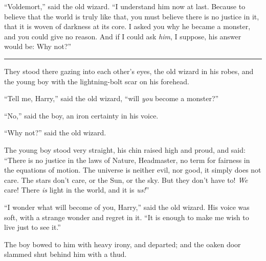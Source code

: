 ``Voldemort,'' said the old wizard. ``I understand him now at last. Because to believe that the world is truly like that, you must believe there is no justice in it, that it is woven of darkness at its core. I asked you why he became a monster, and you could give no reason. And if I could ask \emph{him}, I suppose, his answer would be: Why not?''

\begin{center}\rule{3in}{0.4pt}\end{center}

They stood there gazing into each other's eyes, the old wizard in his robes, and the young boy with the lightning-bolt scar on his forehead.

``Tell me, Harry,'' said the old wizard, ``will \emph{you} become a monster?''

``No,'' said the boy, an iron certainty in his voice.

``Why not?'' said the old wizard.

The young boy stood very straight, his chin raised high and proud, and said: ``There is no justice in the laws of Nature, Headmaster, no term for fairness in the equations of motion. The universe is neither evil, nor good, it simply does not care. The stars don't care, or the Sun, or the sky. But they don't have to! \emph{We} care! There \emph{is} light in the world, and it is \emph{us!}''

``I wonder what will become of you, Harry,'' said the old wizard. His voice was soft, with a strange wonder and regret in it. ``It is enough to make me wish to live just to see it.''

The boy bowed to him with heavy irony, and departed; and the oaken door slammed shut behind him with a thud.
